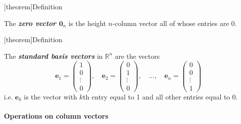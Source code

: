 \documentclass[12pt]{report}
\theoremstyle{definition}
\begin{document}
[theorem]{Definition}
\begin{zero vector}
    The \textbf{\emph{zero vector $\mathbf{0}_n$}} is the height $n$-column vector all of whose entries are 0.
\end{zero vector}


[theorem]{Definition}
\begin{standard basis vector}
    The \textbf{\emph{standard basis vectors}} in $\mathbb{R}^{n}$ are the vectors\[
        \mathbf{e}_1 = \begin{pmatrix}
                1\\
                0\\
                \vdots\\
                0
        \end{pmatrix}, \quad
        \mathbf{e}_2 = \begin{pmatrix}
                0\\
                1\\
                \vdots\\
                0
        \end{pmatrix}, \quad \ldots, \quad
        \mathbf{e}_n = \begin{pmatrix}
                0\\
                0\\
                \vdots\\
                1
        \end{pmatrix}
    \]
    i.e. $\mathbf{e}_k$ is the vector with $k$th entry equal to 1 and all other entries equal to 0.
\end{standard basis vector}

\paragraph{Operations on column vectors}
\end{document}
